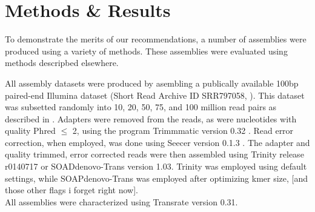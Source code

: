 \section*{Methods & Results}

To demonstrate the merits of our recommendations, a number of assemblies were produced using a variety of methods. These assemblies were evaluated using methods descripbed elsewhere. 

All assembly datasets were produced by asembling a publically available 100bp paired-end Illumina dataset (Short Read Archive ID SRR797058, \citep{Macfarlan:2012js}). This dataset was subsetted randomly into 10, 20, 50, 75, and 100 million read pairs as described in \citep{MacManes:2014io}. Adapters were removed from the reads, as were nucleotides with quality Phred $\leq$ 2, using the program Trimmmatic version 0.32 \citep{Bolger:2014ek}. Read error correction, when employed, was done using Seecer version 0.1.3 \citep{Le:2013dy}. The adapter and quality trimmed, error corrected reads were then assembled using Trinity release r0140717 or SOADdenovo-Trans version 1.03. Trinity was employed using default settings, while SOAPdenovo-Trans was employed after optimizing kmer size, [and those other flags i forget right now]. \\

All assemblies were characterized using Transrate version 0.31. 
